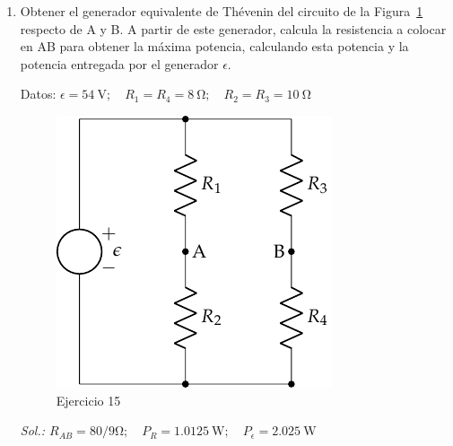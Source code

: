 \begin{enumerate}
\item Obtener el generador equivalente de Thévenin del circuito de la Figura~\ref{fig.ejTheveninRAB_BT1} respecto de A y B. A partir de este generador, calcula la resistencia a colocar en AB para obtener la máxima potencia, calculando esta potencia y la potencia entregada por el generador $\epsilon$.

  Datos: $\epsilon = \qty{54}{\volt};\quad R_1 = R_4 = \qty{8}{\ohm};\quad R_2 = R_3 = \qty{10}{\ohm}$

    \begin{figure}[H]
      \centering
      \includegraphics{../figs/Thevenin2}
      \caption{Ejercicio 15}
      \label{fig.ejTheveninRAB_BT1}
    \end{figure}

    \emph{Sol.: $R_{AB} = 80/9\si{\ohm}; \quad   P_R = \qty{1.0125}{\watt}; \quad
    P_\epsilon = \qty{2.025}{\watt}$}


\end{enumerate}
